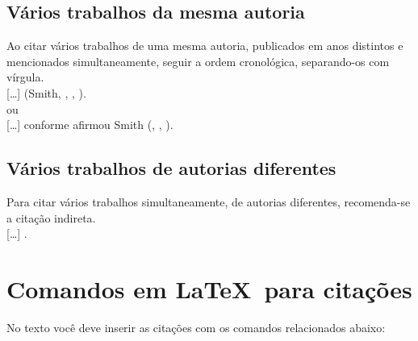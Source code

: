 \subsection{Vários trabalhos da mesma autoria}

Ao citar vários trabalhos de uma mesma autoria, publicados em anos distintos e mencionados simultaneamente, seguir a ordem cronológica, separando-os com vírgula.\\

[\ldots] (Smith, \citeyear{Smith1990}, \citeyear{Smith1999}, \citeyear{Smith2002}). \\

ou\\

[\ldots] conforme afirmou Smith (\citeyear{Smith1990}, \citeyear{Smith1999}, \citeyear{Smith2002}).\\


\subsection{Vários trabalhos de autorias diferentes}

Para citar vários trabalhos simultaneamente, de autorias diferentes,  recomenda-se a citação indireta.\\

[\ldots] \cite{Ando1990,Ferreira1989,SilvaRibeiro2001}.  \\


\section{Comandos em \LaTeX\ para citações}


No texto você deve inserir as citações com os comandos relacionados abaixo:

